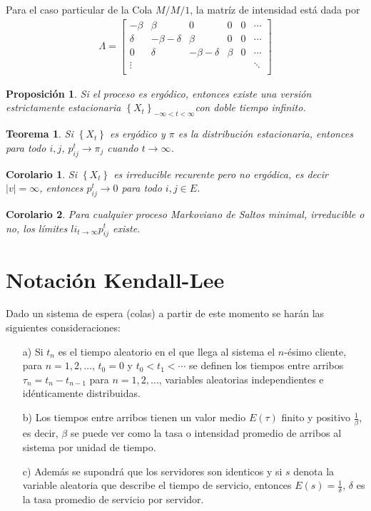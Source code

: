 \documentclass{article}
\newtheorem{Teo}{Teorema}[section]
\newtheorem{Prop}{Proposición}[section]
\newtheorem{Cor}{Corolario}[section]
\numberwithin{equation}{section}
\begin{document}
Para el caso particular de la Cola $M/M/1$, la matr\'iz de intensidad est\'a dada por
\begin{eqnarray*}
\Lambda=\left[\begin{array}{cccccc}
-\beta & \beta & 0 &0 &0& \cdots\\
\delta & -\beta-\delta & \beta & 0 & 0 &\cdots\\
0 & \delta & -\beta-\delta & \beta & 0 &\cdots\\
\vdots & & & & & \ddots\\
\end{array}\right]
\end{eqnarray*}


\begin{Prop}
Si el proceso es erg\'odico, entonces existe una versi\'on estrictamente estacionaria $\left\{X_{t}\right\}_{-\infty<t<\infty}$con doble tiempo infinito.
\end{Prop}

\begin{Teo}
Si $\left\{X_{t}\right\}$ es erg\'odico y $\pi$ es la distribuci\'on estacionaria, entonces para todo $i,j$, $p_{ij}^{t}\rightarrow\pi_{j}$ cuando $t\rightarrow\infty$.
\end{Teo}

\begin{Cor}
Si $\left\{X_{t}\right\}$ es irreducible recurente pero no erg\'odica, es decir $|v|=\infty$, entonces $p_{ij}^{t}\rightarrow0$ para todo $i,j\in E$.
\end{Cor}

\begin{Cor}
Para cualquier proceso Markoviano de Saltos minimal, irreducible o no, los l\'imites $li_{t\rightarrow\infty}p_{ij}^{t}$ existe.
\end{Cor}

\section{Notaci\'on Kendall-Lee}
Dado un sistema de espera (colas) a partir de este momento se har\'an las siguientes consideraciones:
\begin{itemize}
\item[a) ]Si $t_{n}$ es el tiempo aleatorio en el que llega al sistema el $n$-\'esimo cliente, para $n=1,2,\ldots$, $t_{0}=0$ y $t_{0}<t_{1}<\cdots$ se definen los tiempos entre arribos $\tau_{n}=t_{n}-t_{n-1}$ para $n=1,2,\ldots$, variables aleatorias independientes e id\'enticamente distribuidas.

\item[b) ]Los tiempos entre arribos tienen un valor medio $E\left(\tau\right)$ finito y positivo $\frac{1}{\beta}$, es decir, $\beta$ se puede ver como la tasa o intensidad promedio de arribos al sistema por unidad de tiempo.
\item[c) ]  Adem\'as se supondr\'a que los servidores son identicos y si $s$ denota la variable aleatoria que describe el tiempo de servicio, entonces $E\left(s\right)=\frac{1}{\delta}$, $\delta$ es la tasa promedio de servicio por servidor.
\end{itemize}
\end{document}
